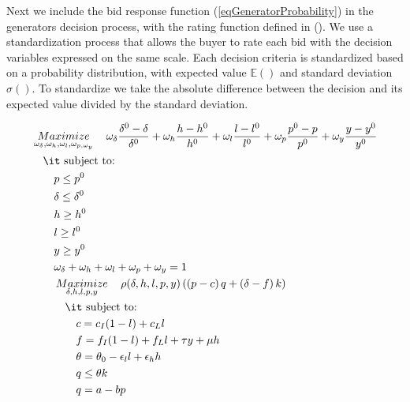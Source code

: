 \documentclass[informs]{informs3}
\begin{document}
Next we include the bid response function (\ref{eqGeneratorProbability}) in the generators decision process, with the rating function defined in (\label{eqGeneratorRating}). We use a standardization process that allows the buyer to rate each bid with the decision variables expressed on the same scale. Each decision criteria is standardized based on a probability distribution, with expected value ${\mathbb{E}()} $ and standard deviation ${\sigma\left(\right)}$. To standardize we take the absolute difference between the decision and its expected value divided by the standard deviation.


\begin{subequations}\label{eqBuyersProblem}
	\begin{align}
	&\mathop {Maximize}\limits_{\omega_{\delta},\omega_{h},\omega_{l},\omega_{p,\omega_{y}}}
	\quad %
	 \omega_{\delta}\frac{\delta^{0}-\delta}{\delta^{0}}+\omega_{h}\frac{h-h^{0}}{h^{0}}+\omega_{l}\frac{l-l^{0}}{l^{0}}+\omega_{p}\frac{p^{0}-p}{p^{0}}+\omega_{y}\frac{y-y^{0}}{y^{0}} \label{eqBuyerObjective}\\
	&\quad \mbox{{\it subject to}:}\notag\\
    &\qquad	 p\leq p^{0}\label{eqBuyerEnergyPrice} \\
	&\qquad	 \delta \leq \delta^{0}\label{eqBuyerCapacityPrice} \\
	&\qquad	 h \geq h^{0}\label{eqBuyerFinance} \\
	&\qquad	 l\geq l^{0}\label{eqBuyerLocal} \\	
	&\qquad	 y \geq y^{0}\label{eqBuyerExperience} \\	
	&\qquad	 \omega_{\delta}+\omega_{h}+\omega_{l}+\omega_{p}+\omega_{y}=1\label{eqBuyerNormal} \\		
	&\qquad \mathop {Maximize}\limits_{\delta, h, l, p, y}
	\quad \rho(\delta, h, l,p,y)\left(\left(p-c\right)q+\left(\delta-f\right)k\right) \label{eqGeneratorObjective}\\ 
	&\qquad \quad \mbox{{\it subject to}:}\notag\\
	&\qquad \qquad c = c_I(1-l)+c_Ll \label{eqBuyerMarginalCost}\\
	&\qquad \qquad f = f_I(1-l)+f_Ll+\tau y+\mu h \label{eqBuyerFixedCost}\\
	&\qquad \qquad \theta = \theta_0-\epsilon_l l  +\epsilon_h h \label{eqBuyerTheta}\\
    &\qquad \qquad q \leq \theta k	\label{eqBuyerEnergySupply}\\
	&\qquad \qquad q = a - bp \label{eqBuyerEnergyDemand}\\	

\end{align}
\end{subequations}
\end{document}
